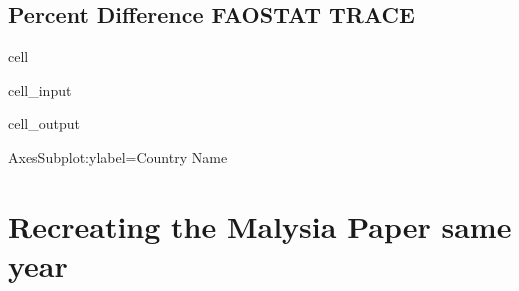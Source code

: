 \documentclass[letterpaper,10pt,english]{jupyterBook}
\begin{document}
\subsection{Percent Difference FAOSTAT \sphinxhyphen{} TRACE}
\label{\detokenize{notebooks/replicating_paper:id6}}
\begin{sphinxuseclass}{cell}\begin{sphinxVerbatimInput}

\begin{sphinxuseclass}{cell_input}
\begin{sphinxVerbatim}[commandchars=\\\{\}]
        \PYG{p}{[}\PYG{p}{]}       
\end{sphinxVerbatim}

\end{sphinxuseclass}\end{sphinxVerbatimInput}
\begin{sphinxVerbatimOutput}

\begin{sphinxuseclass}{cell_output}
\begin{sphinxVerbatim}[commandchars=\\\{\}]
\PYGZlt{}AxesSubplot:ylabel=\PYGZsq{}Country Name\PYGZsq{}\PYGZgt{}
\end{sphinxVerbatim}

\noindent{}

\end{sphinxuseclass}\end{sphinxVerbatimOutput}

\end{sphinxuseclass}

\section{Recreating the Malysia Paper same year}
\label{\detokenize{notebooks/replicating_paper:recreating-the-malysia-paper-same-year}}
\end{document}
